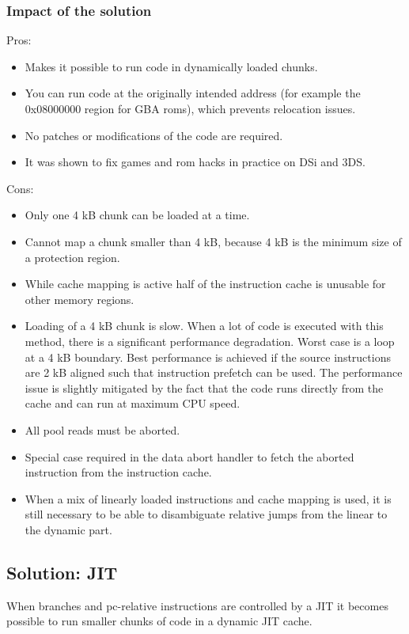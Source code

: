 \documentclass[a4paper,10pt]{report}
\begin{document}
	\subsubsection{Impact of the solution}
	Pros:
	\begin{itemize}
		\item Makes it possible to run code in dynamically loaded chunks.
		\item You can run code at the originally intended address (for example the 0x08000000 region for GBA roms), which prevents relocation issues.
		\item No patches or modifications of the code are required.
		\item It was shown to fix games and rom hacks in practice on DSi and 3DS.
	\end{itemize}
	Cons:
	\begin{itemize}
		\item Only one 4 kB chunk can be loaded at a time.
		\item Cannot map a chunk smaller than 4 kB, because 4 kB is the minimum size of a protection region.
		\item While cache mapping is active half of the instruction cache is unusable for other memory regions.
		\item Loading of a 4 kB chunk is slow. When a lot of code is executed with this method, there is a significant performance degradation. Worst case is a loop at a 4 kB boundary. Best performance is achieved if the source instructions are 2 kB aligned such that instruction prefetch can be used. The performance issue is slightly mitigated by the fact that the code runs directly from the cache and can run at maximum CPU speed.
		\item All pool reads must be aborted.
		\item Special case required in the data abort handler to fetch the aborted instruction from the instruction cache.
		\item When a mix of linearly loaded instructions and cache mapping is used, it is still necessary to be able to disambiguate relative jumps from the linear to the dynamic part.
	\end{itemize}
	
	\subsection{Solution: JIT}
	When branches and pc-relative instructions are controlled by a JIT it becomes possible to run smaller chunks of code in a dynamic JIT cache.
	
\end{document}
